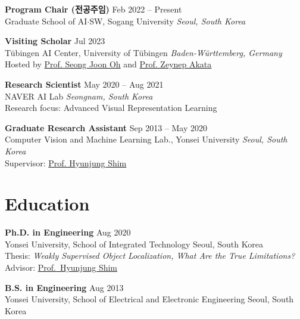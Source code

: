 \documentclass[letterpaper,11pt]{article}
\begin{document}
\vspace{0.25cm}

\textbf{Program Chair (전공주임)} \hfill Feb 2022 -- Present\\
Graduate School of AI$\cdot$SW, Sogang University \hfill \textit{Seoul, South Korea}

\vspace{0.25cm}

\textbf{Visiting Scholar} \hfill Jul 2023\\
T\"ubingen AI Center, University of T\"ubingen \hfill \textit{Baden-W\"urttemberg, Germany}\\
Hosted by \href{https://coallaoh.github.io/}{Prof. Seong Joon Oh} and \href{https://www.eml-unitue.de/}{Prof. Zeynep Akata}

\vspace{0.25cm}

\textbf{Research Scientist} \hfill May 2020 -- Aug 2021\\
NAVER AI Lab \hfill \textit{Seongnam, South Korea}\\
Research focus: Advanced Visual Representation Learning

\vspace{0.25cm}

\textbf{Graduate Research Assistant} \hfill Sep 2013 -- May 2020\\
Computer Vision and Machine Learning Lab., Yonsei University \hfill \textit{Seoul, South Korea}\\
Supervisor: \href{https://kaist-cvml.github.io/}{Prof. Hyunjung Shim}

\section{Education}

\textbf{Ph.D. in Engineering} \hfill Aug 2020\\
Yonsei University, School of Integrated Technology \hfill Seoul, South Korea\\
Thesis: \textit{Weakly Supervised Object Localization, What Are the True Limitations?}\\
Advisor: \href{https://kaist-cvml.github.io/}{Prof.\ Hyunjung Shim}

\vspace{0.25cm}

\textbf{B.S. in Engineering} \hfill Aug 2013\\
Yonsei University, School of Electrical and Electronic Engineering \hfill Seoul, South Korea
\end{document}
